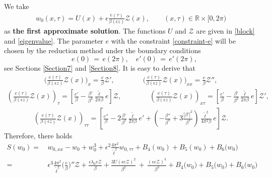 \documentclass[10pt, reqno]{amsart}
\numberwithin{equation}{section}
\theoremstyle{definition}
\begin{document}
{{\subsubsection{}
We take
\begin{align}
w_0(x, \tau)=U(x)+\epsilon \frac {e(\tau)}{\beta(\epsilon z)} \mathcal{Z}(x),
\qquad (x, \tau)\in{\mathbb R}\times[0, 2\pi)
\label{first-approximation}
\end{align}
as {\bf{the first approximate solution}}.
The functions $U$ and $\mathcal{Z}$ are given in \eqref{block} and \eqref{eigenvalue}.
The parameter $e$ with the constraint \eqref{constraint-e} will be chosen by the reduction method under the boundary conditions
$$
\quad e(0) \,=\, e(2\pi), \quad e'(0) \,=\, e'(2\pi),
$$
see Sections \ref{Section7} and \ref{Section8}.
It is easy to derive that
\begin{align*}
\Big(\frac{e(\tau)}{\beta(\epsilon z)} {\mathcal Z}(x)\Big)_x= \frac{e}{\beta}  {\mathcal Z}',
\qquad\qquad
\Big(\frac{e(\tau)}{\beta(\epsilon z)} {\mathcal Z}(x)\Big)_{xx}=\frac{e}{\beta} {\mathcal Z}'',
\end{align*}
\begin{align*}
\left(\frac{e(\tau)}{\beta(\epsilon z)} {\mathcal Z}(x)\right)_{\tau}
= \left[\frac{e'}{\beta}- \frac{\beta'} {\beta^2} \frac{\tilde \ell} {2\pi \beta} e\right]{\mathcal Z},
\qquad\qquad
 \left(\frac{e(\tau)}{\beta(\epsilon z)} {\mathcal Z}(x)\right)_{x\tau}
= \left[\frac{e'}{\beta}- \frac{\beta'} {\beta^2} \frac{\tilde \ell} {2\pi \beta} e\right]{\mathcal Z}',
\end{align*}
\begin{align*}
 \left(\frac{e(\tau)}{\beta(\epsilon z)} {\mathcal Z}(x)\right)_{\tau\tau}
 = \left[\frac{e''}{\beta}- 2\frac{\beta'} {\beta^2} \frac{\tilde \ell} {2\pi \beta} e' +\left(- \frac{\beta''} {\beta^3} + 3\frac{|\beta'|^2} {\beta^4} \right) \frac{\tilde \ell^2} {4\pi^2 \beta}e\right] {\mathcal Z}.
\end{align*}
Therefore, there holds
\begin{align}
S(w_0)=&\, w_{0,xx} - w_{0} + w_{0}^3
+ \epsilon^2\frac{4\pi^2}{{\tilde\ell}^2} w_{0,\tau\tau}
+ B_4(w_0)+B_5(w_0)+ B_6\big(w_0\big)
\nonumber\\[2mm]
=&\,
\epsilon^3\frac{4\pi^2}{{\tilde\ell}^2} \big( \frac {e}{\beta} \big)''\mathcal Z
 +\frac{\epsilon\lambda_0 e{\mathcal Z}}{\beta}
 +\frac{3U(\epsilon e{\mathcal Z} )^2}{\beta^2}\,+\, \frac{(\epsilon e{\mathcal Z} )^3}{\beta^3}
 + B_4\big(w_0\big)
+ B_5\big(w_0\big)
+ B_6\big(w_0\big)
\label{S(w_0)}
\nonumber\\[2mm]

\end{align}}}
\end{document}
